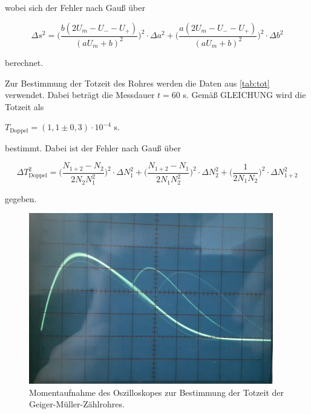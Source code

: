 wobei sich der Fehler nach Gauß über

\begin{equation}
    \Delta s^2 = \bigg( \dfrac{b\left(2 U_m - U_- -U_+ \right)}{\left(a U_m + b \right)^2} \bigg)^2 \cdot \Delta a^2 + \bigg( \dfrac{a\left(2U_m - U_- - U_+ \right)}{\left(a U_m + b \right)^2} \bigg)^2 \cdot \Delta b^2
\end{equation}

berechnet.



Zur Bestimmung der Totzeit des Rohres werden die Daten aus \autoref{tab:tot} verwendet.
Dabei beträgt die Messdauer $t = 60$ s.
Gemäß GLEICHUNG wird die Totzeit als

\begin{center}
    $T_\text{Doppel} = (1,1 \pm 0,3) \cdot 10^{-4}$ s.
\end{center}

bestimmt. Dabei ist der Fehler nach Gauß über

\begin{equation}
    \Delta T_\text{Doppel}^2 = \bigg( \dfrac{N_{1+2} - N_2}{2 N_2 N_1^2} \bigg)^2 \cdot \Delta N_1^2 + \bigg( \dfrac{N_{1+2} - N_1}{2 N_1 N_2^2}  \bigg)^2 \cdot \Delta N_2^2 + \bigg( \dfrac{1}{2 N_1 N_2} \bigg)^2 \cdot \Delta N_{1+2}^2
\end{equation}

gegeben.

\begin{figure}
  \centering
  \includegraphics[width=0.95\textwidth]{content/osz.png}
  \caption{Momentaufnahme des Oszilloskopes zur Bestimmung der Totzeit der Geiger-Müller-Zählrohres.}
  \label{fig:osz}
\end{figure}

